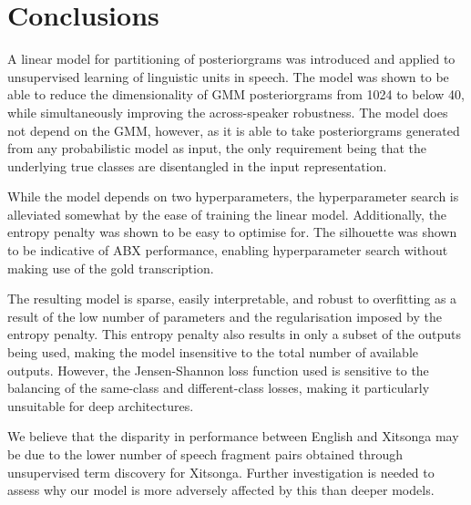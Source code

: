 \section{Conclusions}
A linear model for partitioning of posteriorgrams was introduced and applied to unsupervised learning of linguistic units in speech.
The model was shown to be able to reduce the dimensionality of GMM posteriorgrams from 1024 to below 40, while simultaneously improving the across-speaker robustness.
The model does not depend on the GMM, however, as it is able to take posteriorgrams generated from any probabilistic model as input, the only requirement being that the underlying true classes are disentangled in the input representation.

While the model depends on two hyperparameters, the hyperparameter search is alleviated somewhat by the ease of training the linear model.
Additionally, the entropy penalty was shown to be easy to optimise for.
The silhouette was shown to be indicative of ABX performance, enabling hyperparameter search without making use of the gold transcription.

The resulting model is sparse, easily interpretable, and robust to overfitting as a result of the low number of parameters and the regularisation imposed by the entropy penalty.
This entropy penalty also results in only a subset of the outputs being used, making the model insensitive to the total number of available outputs.
However, the Jensen-Shannon loss function used is sensitive to the balancing of the same-class and different-class losses, making it particularly unsuitable for deep architectures.

We believe that the disparity in performance between English and Xitsonga may be due to the lower number of speech fragment pairs obtained through unsupervised term discovery for Xitsonga.
Further investigation is needed to assess why our model is more adversely affected by this than deeper models.


